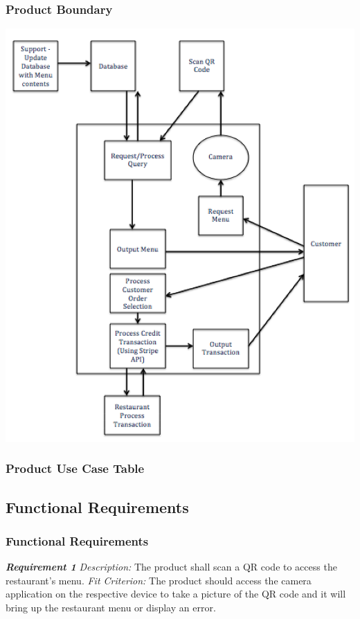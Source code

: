 \documentclass[12pt, titlepage]{article}
\begin{document}
\subsubsection{Product Boundary}
\includegraphics{ProductBoundary.png}
\subsubsection{Product Use Case Table}
\subsection{Functional Requirements}

\subsubsection{Functional Requirements}

\textbf{\textit{Requirement 1}}\newline
\textit{Description:}\newline
The product shall scan a QR code to access the restaurant's menu.\newline\newline
\textit{Fit Criterion:}\newline 
The product should access the camera application on the respective device to take a picture of the QR code and it will bring up the restaurant menu or display an error.
\newline
\end{document}
